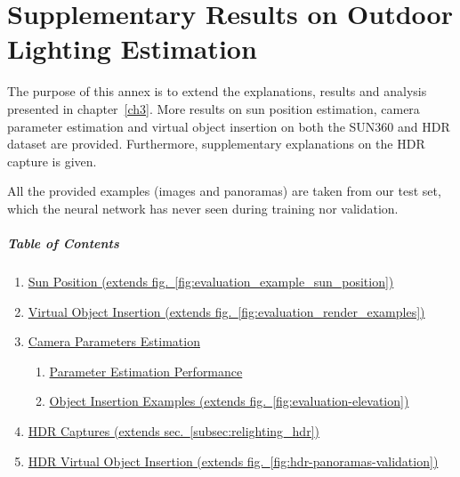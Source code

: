 \chapter{Supplementary Results on Outdoor Lighting Estimation}     %
\label{annex4}

\graphicspath{{annex4_figures/}}

The purpose of this annex is to extend the explanations, results and
analysis presented in chapter~\ref{ch3}. More results on sun position
estimation, camera parameter estimation and virtual object insertion on
both the SUN360 and HDR dataset are provided. Furthermore, supplementary
explanations on the HDR capture is given.

All the provided examples (images and panoramas) are taken from our test
set, which the neural network has never seen during training nor
validation.

\hypertarget{table-of-contents}{%
\paragraph{Table of Contents}\label{table-of-contents}}

\begin{enumerate}
\tightlist
\item
  \protect\hyperlink{sunpos}{Sun Position (extends fig.~\ref{fig:evaluation_example_sun_position})}
\item
  \protect\hyperlink{virtualobjectinsert}{Virtual Object Insertion
  (extends fig.~\ref{fig:evaluation_render_examples})}
\item
  \protect\hyperlink{camparameval}{Camera Parameters Estimation}

  \begin{enumerate}
  \tightlist
  \item
    \protect\hyperlink{camparamestimperf}{Parameter Estimation
    Performance}
  \item
    \protect\hyperlink{camparaminsertionex}{Object Insertion Examples
    (extends fig.~\ref{fig:evaluation-elevation})}
  \end{enumerate}
\item
  \protect\hyperlink{HDRcaptures}{HDR Captures (extends sec.~\ref{subsec:relighting_hdr})}
\item
  \protect\hyperlink{virtualobjectinsertHDR}{HDR Virtual Object
  Insertion (extends fig.~\ref{fig:hdr-panoramas-validation})}
\end{enumerate}

